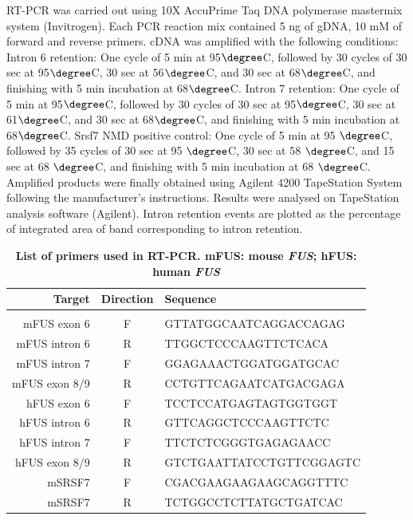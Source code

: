 RT-PCR was carried out using 10X AccuPrime Taq DNA polymerase mastermix system (Invitrogen). 
Each PCR reaction mix contained 5 ng of gDNA, 10 mM of forward and reverse primers. cDNA was amplified with the following conditions:
Intron 6 retention: One cycle of 5 min at 95$\degree$C, followed by 30 cycles of 30 sec at 95$\degree$C, 30 sec at 56$\degree$C, and 30 sec at 68$\degree$C, and finishing with 5 min incubation at 68$\degree$C.
Intron 7 retention: One cycle of 5 min at 95$\degree$C, followed by 30 cycles of 30 sec at 95$\degree$C, 30 sec at 61$\degree$C, and 30 sec at 68$\degree$C, and finishing with 5 min incubation at 68$\degree$C.
Srsf7 NMD positive control: One cycle of 5 min at 95 $\degree$C, followed by 35 cycles of 30 sec at 95 $\degree$C, 30 sec at 58 $\degree$C, and 15 sec at 68 $\degree$C, and finishing with 5 min incubation at 68 $\degree$C.
Amplified products were finally obtained using Agilent 4200 TapeStation System following the manufacturer's instructions. Results were analysed on TapeStation analysis software (Agilent).
Intron retention events are plotted  as the percentage of integrated area of band corresponding to intron retention.



\begin{table}[h!]
	\centering
	\begin{tabular}{rcl}
		\textbf{Target} & \textbf{Direction} & \textbf{Sequence}\\
		\hline \\[-0.3cm]
		mFUS exon 6  & F &  GTTATGGCAATCAGGACCAGAG\\
		mFUS intron 6 & R & TTGGCTCCCAAGTTCTCACA\\
		mFUS intron 7 & F &  GGAGAAACTGGATGGATGCAC\\
		mFUS exon 8/9 & R &  CCTGTTCAGAATCATGACGAGA\\[0.2cm]
		hFUS exon 6 & F & TCCTCCATGAGTAGTGGTGGT \\
		hFUS intron 6 & R & GTTCAGGCTCCCAAGTTCTC\\
		hFUS intron 7 & F & TTCTCTCGGGTGAGAGAACC\\
		hFUS exon 8/9 & R & GTCTGAATTATCCTGTTCGGAGTC\\[0.2cm]
		mSRSF7 & F &  CGACGAAGAAGAAGCAGGTTTC\\
		mSRSF7& R & TCTGGCCTCTTATGCTGATCAC\\
	\end{tabular}
	\caption{\textbf{List of primers used in RT-PCR. mFUS: mouse \textit{FUS}; hFUS: human \textit{FUS}}}
	\label{tab:fus_primers}
\end{table}

